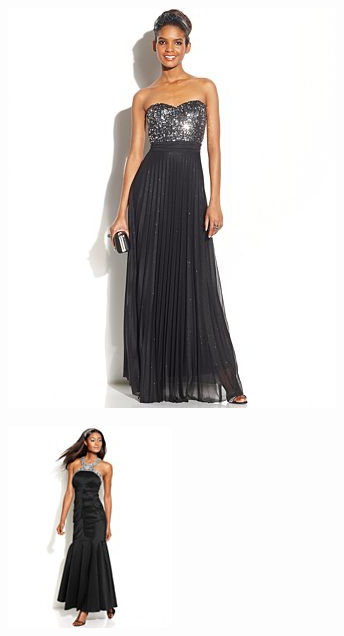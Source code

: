 \documentclass[11pt]{article}
\begin{document}
\begin{figure}
\begin{subfigure}{.18\textwidth}
\includegraphics[width=\linewidth]{concepts/concept1_neg4.jpg}
\label{fig:sub2}
\end{subfigure}
\begin{subfigure}{.18\textwidth}
\centering
\includegraphics[width=\linewidth]{concepts/concept1_neg5.jpg}

\end{subfigure}
\end{figure}
\end{document}
